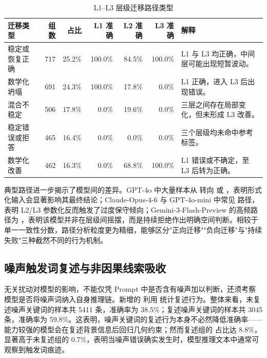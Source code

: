 \begin{table}[t]
\centering
\caption{L1--L3 层级迁移路径类型}
\label{tab:transition-types}
\footnotesize
\begin{tabularx}{0.98\textwidth}{p{}rrrrrp{}}
\toprule
迁移类型 & 组数 & 占比 & L1 准确 & L2 准确 & L3 准确 & 解释 \\
\midrule
稳定或恢复正确 & 717 & 25.2\% & 100.0\% & 84.5\% & 100.0\% & L1 与 L3 均正确，中间层可能出现短暂波动。\\
数学化坍塌 & 691 & 24.3\% & 100.0\% & 17.8\% & 0.0\% & L1 正确，进入 L3 后出现错误。\\
混合不稳定 & 506 & 17.8\% & 0.0\% & 19.6\% & 0.0\% & 三层之间存在局部变化，但未形成 L3 改善。\\
稳定错误或拒答 & 465 & 16.4\% & 0.0\% & 0.0\% & 0.0\% & 三个层级均未命中参考标签。\\
数学化改善 & 462 & 16.3\% & 0.0\% & 68.8\% & 100.0\% & L1 错误或不确定，至 L3 后转为正确。\\
\bottomrule
\end{tabularx}
\end{table}

典型路径进一步揭示了模型间的差异。GPT-4o 中大量样本从  转向  或 ，表明形式化输入会显著影响其最终结论；Claude-Opus-4-6 与 GPT-4o-mini 中常见  路径，表明 L2/L3 参数化反而触发了过度保守倾向；Gemini-3-Flash-Preview 的高频路径为 ，表明该模型并非在层级间摇摆，而是持续拒绝作出明确空间判断。相较于单一一致性分数，路径分析粒度更为精细，能够区分"正向迁移""负向迁移"与"持续失败"三种截然不同的行为机制。

\subsection{噪声触发词复述与非因果线索吸收}

无关扰动对模型的影响，不能仅凭 Prompt 中是否含有噪声加以判断，还须考察模型是否将噪声词纳入自身推理链。新增的  利用  统计复述行为。整体来看，未复述噪声关键词的样本共 5411 条，准确率为 38.5\%；复述噪声关键词的样本共 3045 条，准确率为 59.8\%。这表明，噪声关键词的复述行为本身不必然降低准确率——能力较强的模型会在复述背景信息后回归几何约束；然而复述组的  占比达 8.8\%，显著高于未复述组的 0.7\%，表明当噪声错误确实发生时，模型推理文本中通常可观察到触发词痕迹。

